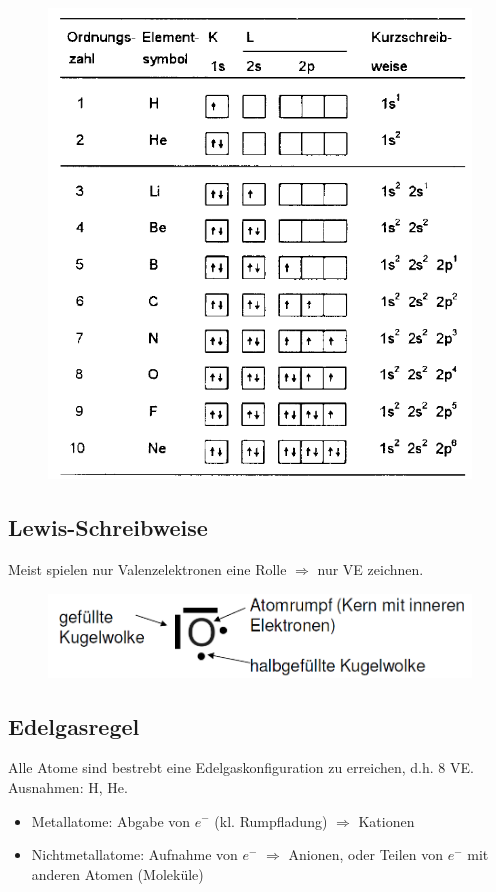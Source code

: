 \begin{figure}[htbp]
	\centering
	\includegraphics[width=0.75\linewidth]{images/2_Konfiguration_Orbitale.png}
\end{figure}

\subsection{Lewis-Schreibweise}
Meist spielen nur Valenzelektronen eine Rolle $\Rightarrow$ nur VE zeichnen.
\begin{figure}[htbp]
	\centering
	\includegraphics[width=0.5\linewidth]{images/2_Lewis_Schreibweise.png}
\end{figure}

\subsection{Edelgasregel}
Alle Atome sind bestrebt eine Edelgaskonfiguration zu erreichen, d.h. 8 VE. Ausnahmen: H, He.

\begin{itemize}
	\item Metallatome: Abgabe von $e^-$ (kl. Rumpfladung) $\Rightarrow$ Kationen
	\item Nichtmetallatome: Aufnahme von $e^-$ $\Rightarrow$ Anionen, oder Teilen von $e^-$ mit anderen Atomen (Moleküle)
\end{itemize}